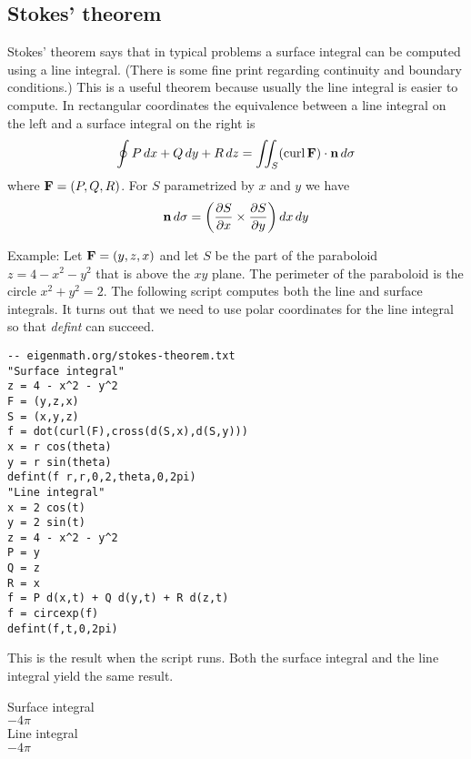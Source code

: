 \subsection{Stokes' theorem}

Stokes' theorem says that in typical problems a surface integral can be
computed using a line integral.
(There is some fine print regarding continuity and boundary conditions.)
This is a useful theorem because usually the line integral is easier to
compute.
In rectangular coordinates the equivalence between a line integral
on the left and a surface integral on the right is
%
$$\oint P\,dx+Q\,dy+R\,dz
=\int\!\!\!\int_S(\mathop{\rm curl}{\bf F})\cdot{\bf n}\,d\sigma
$$
%
where ${\bf F}=(P,Q,R)$.
For $S$ parametrized by $x$ and $y$ we have
$${\bf n}\,d\sigma=\left(
\frac{\partial S}{\partial x}\times\frac{\partial S}{\partial y}
\right)dx\,dy$$

\noindent
Example:
Let ${\bf F}=(y,z,x)$ and let $S$ be the part of the paraboloid
$z=4-x^2-y^2$
that is above the $xy$ plane.
The perimeter of the paraboloid is the circle $x^2+y^2=2$.
The following script computes both the line and surface integrals.
It turns out that we need to use polar coordinates for the
line integral so that {\it defint} can succeed.

{\color{blue}
\begin{verbatim}
-- eigenmath.org/stokes-theorem.txt
"Surface integral"
z = 4 - x^2 - y^2
F = (y,z,x)
S = (x,y,z)
f = dot(curl(F),cross(d(S,x),d(S,y)))
x = r cos(theta)
y = r sin(theta)
defint(f r,r,0,2,theta,0,2pi)
"Line integral"
x = 2 cos(t)
y = 2 sin(t)
z = 4 - x^2 - y^2
P = y
Q = z
R = x
f = P d(x,t) + Q d(y,t) + R d(z,t)
f = circexp(f)
defint(f,t,0,2pi)
\end{verbatim}
}

\noindent
This is the result when the script runs.
Both the surface integral and the line integral
yield the same result.

\bigskip
\noindent
Surface integral\\
$\displaystyle -4\pi$\\
Line integral\\
$\displaystyle -4\pi$
